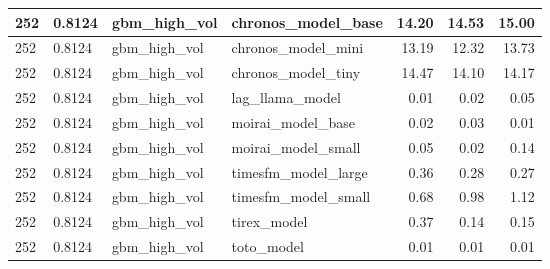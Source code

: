 {\begin{tabular}{llllrrr}
\midrule
252 & 0.8124 & gbm\_high\_vol & chronos\_model\_base & 14.20 & 14.53 & 15.00 \\
\midrule
252 & 0.8124 & gbm\_high\_vol & chronos\_model\_mini & 13.19 & 12.32 & 13.73 \\
\midrule
252 & 0.8124 & gbm\_high\_vol & chronos\_model\_tiny & 14.47 & 14.10 & 14.17 \\
\midrule
252 & 0.8124 & gbm\_high\_vol & lag\_llama\_model & 0.01 & 0.02 & 0.05 \\
\midrule
252 & 0.8124 & gbm\_high\_vol & moirai\_model\_base & 0.02 & 0.03 & 0.01 \\
\midrule
252 & 0.8124 & gbm\_high\_vol & moirai\_model\_small & 0.05 & 0.02 & 0.14 \\
\midrule
252 & 0.8124 & gbm\_high\_vol & timesfm\_model\_large & 0.36 & 0.28 & 0.27 \\
\midrule
252 & 0.8124 & gbm\_high\_vol & timesfm\_model\_small & 0.68 & 0.98 & 1.12 \\
\midrule
252 & 0.8124 & gbm\_high\_vol & tirex\_model & 0.37 & 0.14 & 0.15 \\
\midrule
252 & 0.8124 & gbm\_high\_vol & toto\_model & 0.01 & 0.01 & 0.01 \\
\bottomrule
\end{tabular}
}